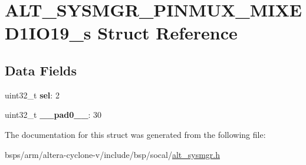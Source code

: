 \hypertarget{structALT__SYSMGR__PINMUX__MIXED1IO19__s}{}\section{A\+L\+T\+\_\+\+S\+Y\+S\+M\+G\+R\+\_\+\+P\+I\+N\+M\+U\+X\+\_\+\+M\+I\+X\+E\+D1\+I\+O19\+\_\+s Struct Reference}
\label{structALT__SYSMGR__PINMUX__MIXED1IO19__s}
\subsection*{Data Fields}
\begin{DoxyCompactItemize}
\item 
\mbox{\label{structALT__SYSMGR__PINMUX__MIXED1IO19__s_ab8ba1e40541032a7ee697ec59f4db893}} 
uint32\+\_\+t {\bfseries sel}\+: 2
\item 
\mbox{\label{structALT__SYSMGR__PINMUX__MIXED1IO19__s_ae55839f13d8c3b656d6fba58313ae866}} 
uint32\+\_\+t {\bfseries \+\_\+\+\_\+pad0\+\_\+\+\_\+}\+: 30
\end{DoxyCompactItemize}


The documentation for this struct was generated from the following file\+:\begin{DoxyCompactItemize}
\item 
bsps/arm/altera-\/cyclone-\/v/include/bsp/socal/\mbox{\hyperlink{alt__sysmgr_8h}{alt\+\_\+sysmgr.\+h}}\end{DoxyCompactItemize}
